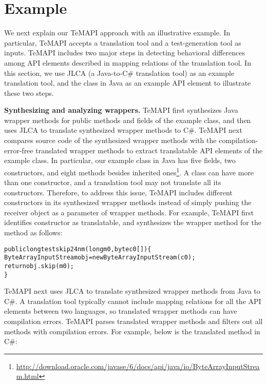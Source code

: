 \section{Example}
\label{sec:example}

We next explain our TeMAPI approach with an illustrative example. In particular, TeMAPI accepts a translation tool and a test-generation tool as inputs. TeMAPI includes two major steps in detecting behavioral differences among API elements described in mapping relations of the translation tool. In this section, we use JLCA (a Java-to-C\# translation tool) as an example translation tool, and the  class in Java as an example API element to illustrate these two steps.


\textbf{Synthesizing and analyzing wrappers.} TeMAPI first synthesizes Java wrapper methods for public methods and fields of the example class, and then uses JLCA to translate synthesized wrapper methods to C\#. TeMAPI next compares source code of the synthesized wrapper methods with the compilation-error-free translated wrapper methods to extract translatable API elements of the example class. In particular, our example class in Java has five fields, two constructors, and eight methods besides inherited ones\footnote{\url{http://download.oracle.com/javase/6/docs/api/java/io/ByteArrayInputStream.html}}. A class can have more than one constructor, and a translation tool may not translate all its constructors. Therefore, to address this issue, TeMAPI includes different constructors in its synthesized wrapper methods instead of simply pushing the receiver object as a parameter of wrapper methods. For example, TeMAPI first identifies  constructor as translatable, and synthesizes the wrapper method for the  method as follows:

\begin{CodeOut}%
\begin{alltt}
public long testskip24nm(long m0, byte c0[])\{
  ByteArrayInputStream obj = new ByteArrayInputStream(c0);
  return obj.skip(m0);
\}
\end{alltt}
\end{CodeOut}%

TeMAPI next uses JLCA to translate synthesized wrapper methods from Java to C\#. A translation tool typically cannot include mapping relations for all the API elements between two languages, so translated wrapper methods can have compilation errors. TeMAPI parses translated wrapper methods and filters out all methods with compilation errors. For example, below is the translated  method in C\#:

